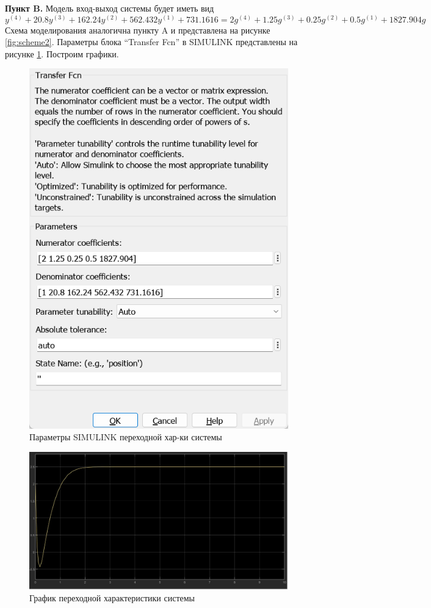 \documentclass[a4paper, 12pt]{article}
\begin{document}
    \textbf{Пункт B.} Модель вход-выход системы будет иметь вид
    $$y^{(4)}+20.8y^{(3)}+162.24y^{(2)}+562.432y^{(1)}+731.1616=2g^{(4)}+1.25g^{(3)}+0.25g^{(2)}+0.5g^{(1)}+1827.904g$$
    Схема моделирования аналогична пункту A и представлена на рисунке \ref{fig:scheme2}.
    Параметры блока ``Transfer Fcn'' в SIMULINK представлены на рисунке \ref{fig:window2_B}. Построим графики.
    \begin{figure}[H]
        \centering
        \includegraphics[scale=0.5]{scheme2_window_B.png}
        \caption{Параметры SIMULINK переходной хар-ки системы}
        \label{fig:window2_B}
    \end{figure}
    \begin{figure}[H]
        \centering
        \includegraphics[scale=0.3]{task_2_B.jpg}
        \captionsetup{skip=0pt}
        \caption{График переходной характеристики системы}
        \label{fig:2B}
    \end{figure}
\end{document}
